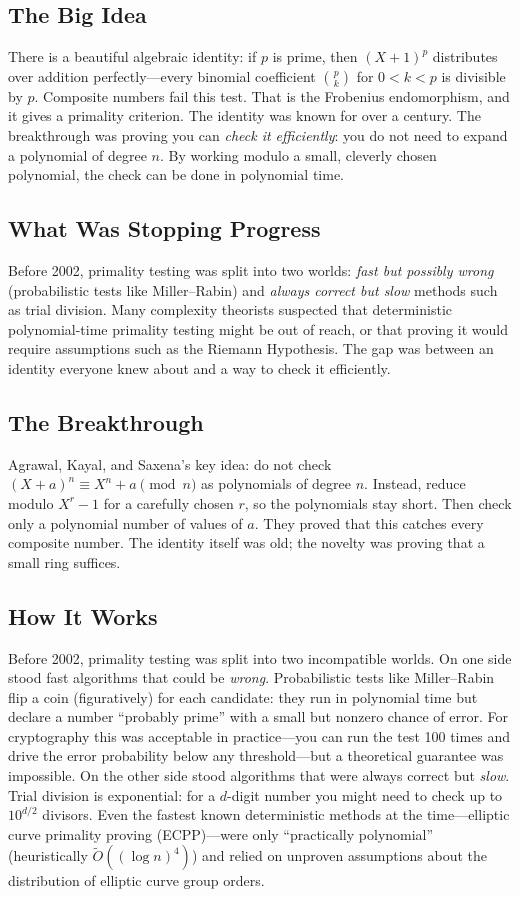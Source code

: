 \subsection{The Big Idea}
There is a beautiful algebraic identity: if $p$ is prime, then $(X + 1)^p$ distributes over addition perfectly---every binomial coefficient $\binom{p}{k}$ for $0 < k < p$ is divisible by $p$. Composite numbers fail this test. That is the Frobenius endomorphism, and it gives a primality criterion. The identity was known for over a century. The breakthrough was proving you can \emph{check it efficiently}: you do not need to expand a polynomial of degree $n$. By working modulo a small, cleverly chosen polynomial, the check can be done in polynomial time.

\subsection{What Was Stopping Progress}
Before 2002, primality testing was split into two worlds: \emph{fast but possibly wrong} (probabilistic tests like Miller--Rabin) and \emph{always correct but slow} methods such as trial division. Many complexity theorists suspected that deterministic polynomial-time primality testing might be out of reach, or that proving it would require assumptions such as the Riemann Hypothesis. The gap was between an identity everyone knew about and a way to check it efficiently.

\subsection{The Breakthrough}
Agrawal, Kayal, and Saxena's key idea: do not check $(X + a)^n \equiv X^n + a \pmod{n}$ as polynomials of degree $n$. Instead, reduce modulo $X^r - 1$ for a carefully chosen $r$, so the polynomials stay short. Then check only a polynomial number of values of $a$. They proved that this catches every composite number. The identity itself was old; the novelty was proving that a small ring suffices.

\subsection{How It Works}

Before 2002, primality testing was split into two incompatible worlds. On one side stood fast algorithms that could be \emph{wrong}. Probabilistic tests like Miller--Rabin flip a coin (figuratively) for each candidate: they run in polynomial time but declare a number ``probably prime'' with a small but nonzero chance of error. For cryptography this was acceptable in practice---you can run the test 100 times and drive the error probability below any threshold---but a theoretical guarantee was impossible. On the other side stood algorithms that were always correct but \emph{slow}. Trial division is exponential: for a $d$-digit number you might need to check up to $10^{d/2}$ divisors. Even the fastest known deterministic methods at the time---elliptic curve primality proving (ECPP)---were only ``practically polynomial'' (heuristically $\tilde{O}((\log n)^4)$) and relied on unproven assumptions about the distribution of elliptic curve group orders.

